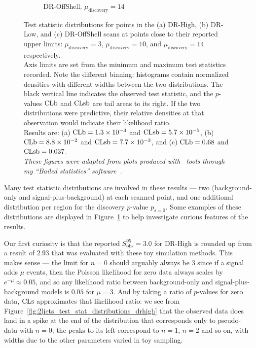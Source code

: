 \begin{figure}[tp]
\begin{subfigure}{0.46\textwidth}
\caption{DR-OffShell, $\mu_\textrm{discovery}=14$}
\end{subfigure}
\caption[
Test statistic distributions for points in the DR-High and DR-Low scans
]{%
Test statistic distributions for points in the (a) DR-High, (b) DR-Low,
and (c) DR-OffShell scans at points close to their reported upper limits:
$\mu_\textrm{discovery}=3$, $\mu_\textrm{discovery}=10$,
and $\mu_\textrm{discovery}=14$ respectively.
\\[0.5em]
Axis limits are set from the minimum and maximum test statistics recorded.
Note the different binning: histograms contain normalized densities with
different widths between the two distributions.
The black vertical line indicates the observed test statistic,
and the $p$-values $\mathrm{CLb}$ and $\mathrm{CLsb}$ are tail areas to its right.
If the two distributions were predictive, their relative densities at that
observation would indicate their likelihood ratio.
\\[0.5em]
Results are:
(a) $\mathrm{CLb} = 1.3\times 10^{-3}$ and $\mathrm{CLsb} = 5.7\times 10^{-5}$,
(b) $\mathrm{CLb} = 8.8\times 10^{-2}$ and $\mathrm{CLsb} = 7.7\times 10^{-3}$,
and (c) $\mathrm{CLb} = 0.68$ and $\mathrm{CLsb} = 0.037$.
\\[0.5em]
\emph{These figures were adapted from plots produced with \histfitter\ tools
through my ``Bailed statistics'' software~\cite{bailedstatisticsgithub}.}
}
\label{fig:2ljets_test_stat_distributions}
\end{figure}

Many test statistic distributions are involved in these results ---
two (background-only and signal-plus-background) at each scanned point,
and one additional distribution per region for the discovery
$p$-value $p_{s\!=\!0}$.
Some examples of these distributions are displayed in
Figure~\ref{fig:2ljets_test_stat_distributions}
to help investigate curious features of the results.

Our first curiosity is that the reported $S_{\mathrm{obs}}^{95} = 3.0$
for DR-High is rounded up from a result of $2.93$ that was evaluated with these
toy simulation methods.
This makes sense --- the limit for $n=0$ should arguably always be $3$ since
if a signal adds $\mu$ events, then the Poisson likelihood for zero data always
scales by $e^{-\mu} \approx 0.05$, and so any likelihood ratio between
background-only and signal-plus-background models is $0.05$ for $\mu = 3$.
And by taking a ratio of $p$-values for zero data, $\mathrm{CLs}$ approximates that
likelihood ratio:
we see from Figure~\ref{fig:2ljets_test_stat_distributions_drhigh} that the
observed data does land in a spike at the end of the distribution that
corresponds only to pseudo-data with $n=0$; the peaks to its left correspond
to $n=1$, $n=2$ and so on, with widths due to the other parameters varied in
toy sampling.

